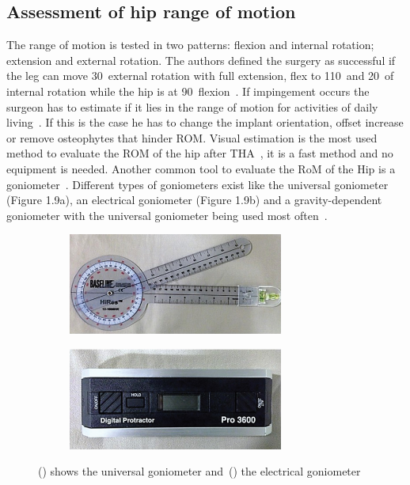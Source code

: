 \documentclass[whitelogo]{tudelft-report}
\begin{document}
{\subsection{Assessment of hip range of motion}
The range of motion is tested in two patterns: flexion and internal rotation; extension and external rotation. The authors defined the surgery as successful if the leg can move 30\degree~external rotation with full extension, flex to 110\degree~and 20\degree~of internal rotation while the hip is at 90\degree~flexion~\cite{harris1980advances}. If impingement occurs the surgeon has to estimate if it lies in the range of motion for activities of daily living~\cite{woerner2016visual}. If this is the case he has to change the implant orientation, offset increase or remove osteophytes that hinder ROM. Visual estimation is the most used method to evaluate the ROM of the hip after THA~\cite{chevillotte2009variability}, it is a fast method and no equipment is needed. Another common tool to evaluate the RoM of the Hip is a goniometer~\cite{mohsin2015factors}. Different types of goniometers exist like the universal goniometer (Figure 1.9a), an electrical goniometer (Figure 1.9b) and a gravity-dependent goniometer with the universal goniometer being used most often~\cite{roach2013concurrent}. 
	
\begin{figure}[ht]
	\centering
	\begin{subfigure}[b]{0.5\linewidth}
		\centering\includegraphics[width=200pt]{goniometerA.jpg}
		\caption{\label{fig:fig1}}
		\end{subfigure}%
		\begin{subfigure}[b]{0.5\linewidth}
		\centering\includegraphics[width=200pt]{goniometerB.jpg}
		\caption{\label{fig:fig2}}
		\end{subfigure}
		\caption{() shows the universal goniometer and~() the electrical goniometer}
\end{figure} 
	
}
\end{document}

